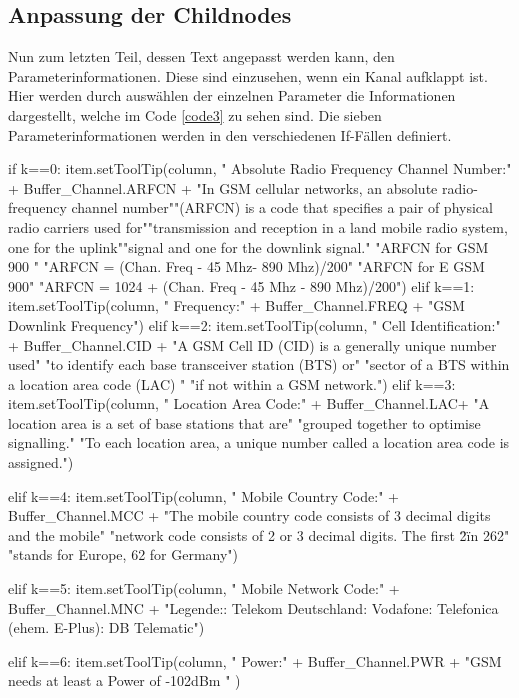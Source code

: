 \subsection*{Anpassung der  Childnodes}

Nun zum letzten Teil, dessen Text angepasst werden kann, den Parameterinformationen. Diese sind einzusehen, wenn ein Kanal aufklappt ist. Hier werden durch auswählen der einzelnen Parameter die Informationen dargestellt, welche im Code \ref{code3} zu sehen sind. Die sieben Parameterinformationen werden in den verschiedenen If-Fällen definiert. 

\begin{code}[firstnumber=204,numbers=left,stepnumber=1,caption={Parameterinformationen},captionpos=b,label={code3}]
if k==0:
	item.setToolTip(column, " Absolute Radio Frequency Channel Number:\n\n " + Buffer_Channel.ARFCN 
	+ "\n\n In GSM cellular networks, an absolute radio-frequency channel number\n ""(ARFCN) is a code that specifies a pair of physical radio carriers used for\n ""transmission and reception in a land mobile radio system, one for the uplink\n ""signal and one for the downlink signal.\n\n "
	"ARFCN for GSM 900 \n "
	"ARFCN = (Chan. Freq - 45 Mhz- 890 Mhz)/200\n\n "
	"ARFCN for E GSM 900\n "
	"ARFCN = 1024 + (Chan. Freq - 45 Mhz - 890 Mhz)/200\n ")
elif k==1:
	item.setToolTip(column, " Frequency:\n\n " + Buffer_Channel.FREQ + "\n\n GSM Downlink Frequency")
elif k==2:
	item.setToolTip(column, " Cell Identification:\n\n " + Buffer_Channel.CID +
	"\n\n A GSM Cell ID (CID) is a generally unique number used\n "
	"to identify each base transceiver station (BTS) or\n "
	"sector of a BTS within a location area code (LAC) \n "
	"if not within a GSM network.")				
elif k==3:
	item.setToolTip(column, " Location Area Code:\n\n " + Buffer_Channel.LAC+
	"\n\n A location area is a set of base stations that are\n "
	"grouped together to optimise signalling.\n "
	"To each location area, a unique number called a location area code is assigned.\n ")
				    
					
elif k==4:
	item.setToolTip(column, " Mobile Country Code:\n\n " + Buffer_Channel.MCC +
	"\n\n The mobile country code consists of 3 decimal digits and the mobile\n "
	"network code consists of 2 or 3 decimal digits. The first \"2\" in 262\n "
	"stands for Europe, 62 for Germany")
				
elif k==5:
	item.setToolTip(column, " Mobile Network Code:\n\n" + Buffer_Channel.MNC +
	"\n\n Legende:: Telekom Deutschland: Vodafone: Telefonica (ehem. E-Plus): DB Telematic")
	
elif k==6:
	item.setToolTip(column, " Power:\n\n " + Buffer_Channel.PWR + 
	"\n\n GSM needs at least a Power of -102dBm " )
\end{code}
 